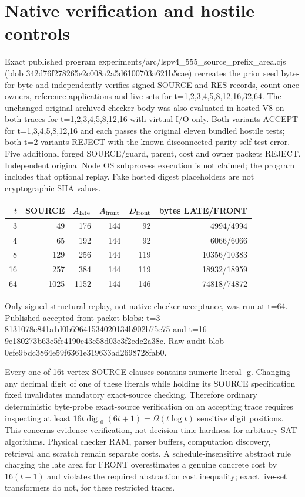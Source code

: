 \documentclass[11pt]{article}
\begin{document}
\section*{Native verification and hostile controls}
Exact published program experiments/arc/lspv4_555_source_prefix_area.cjs (blob 342d76f278265e2c008a2a5d6100703a621b5cae) recreates the prior seed byte-for-byte and independently verifies signed SOURCE and RES records, count-once owners, reference applications and live sets for t=1,2,3,4,5,8,12,16,32,64. The unchanged original archived checker body was also evaluated in hosted V8 on both traces for t=1,2,3,4,5,8,12,16 with virtual I/O only. Both variants ACCEPT for t=1,3,4,5,8,12,16 and each passes the original eleven bundled hostile tests; both t=2 variants REJECT with the known disconnected parity self-test error. Five additional forged SOURCE/guard, parent, cost and owner packets REJECT. Independent original Node OS subprocess execution is not claimed; the program includes that optional replay. Fake hosted digest placeholders are not cryptographic SHA values.

\begin{center}
\begin{tabular}{rrrrrr}
\toprule
$t$ & SOURCE & $A_{\rm late}$ & $A_{\rm front}$ & $D_{\rm front}$ & bytes LATE/FRONT\\
\midrule
3 &49&176&144&92&4994/4994\\
4 &65&192&144&92&6066/6066\\
8 &129&256&144&119&10356/10383\\
16&257&384&144&119&18932/18959\\
64&1025&1152&144&146&74818/74872\\
\bottomrule
\end{tabular}
\end{center}
Only signed structural replay, not native checker acceptance, was run at t=64. Published accepted front-packet blobs: t=3 8131078e841a1d0b69641534020134b902b75e75 and t=16 9e180273b63e5fc4190c43c58d03e3f2edc2a38c. Raw audit blob 0efe9bdc3864e59f6361e319633ad2698728fab0.

Every one of 16t vertex SOURCE clauses contains numeric literal -g. Changing any decimal digit of one of these literals while holding its SOURCE specification fixed invalidates mandatory exact-source checking. Therefore ordinary deterministic byte-probe exact-source verification on an accepting trace requires inspecting at least $16t\operatorname{dig}_{10}(6t+1)=\Omega(t\log t)$ sensitive digit positions. This concerns evidence verification, not decision-time hardness for arbitrary SAT algorithms. Physical checker RAM, parser buffers, computation discovery, retrieval and scratch remain separate costs. A schedule-insensitive abstract rule charging the late area for FRONT overestimates a genuine concrete cost by $16(t-1)$ and violates the required abstraction cost inequality; exact live-set transformers do not, for these restricted traces.
\end{document}
